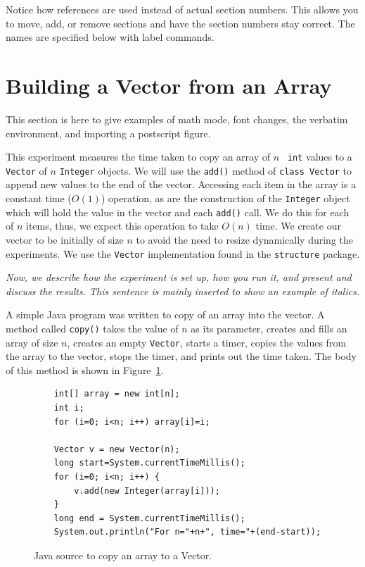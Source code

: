 \documentclass[12pt]{article}
\newcommand{\singlespace}{
  \protect\renewcommand\baselinestretch{1.0}
  \protect\normalsize
}
\begin{document}
Notice how references are used instead of actual section numbers.
This allows you to move, add, or remove sections and have the section
numbers stay correct.  The names are specified below with label commands.

\section{Building a Vector from an Array}
\label{sec:vectarray}

This section is here to give examples of math mode, font changes, the
verbatim environment, and importing a postscript figure.

This experiment measures the time taken to copy an array of $n$ {\tt
int} values to a {\tt Vector} of $n$ {\tt Integer} objects.  We will
use the {\tt add()} method of {\tt class Vector} to append new
values to the end of the vector.  Accessing each item in the array is
a constant time ($O(1)$) operation, as are the construction of the
{\tt Integer} object which will hold the value in the vector and each
{\tt add()} call.  We do this for each of $n$ items, thus, we
expect this operation to take $O(n)$ time.  We create our vector to be
initially of size $n$ to avoid the need to resize dynamically during
the experiments.  We use the {\tt Vector} implementation found in the
{\tt structure} package.


{\it Now, we describe how the experiment is set up, how you run it, and
present and discuss the results.  This sentence is mainly inserted to
show an example of italics.}

A simple Java program was written to copy of an array into the
vector.  A method called {\tt copy()} takes the value of $n$ as its
parameter, creates and fills an array of size $n$, creates an empty
{\tt Vector}, starts a timer, copies the values from the array to the
vector, stops the timer, and prints out the time taken.  The body of
this method is shown in Figure~\ref{fig:code}.

{\singlespace %
\begin{figure}[htb]
\begin{verbatim}
    int[] array = new int[n];
    int i;
    for (i=0; i<n; i++) array[i]=i;
	
    Vector v = new Vector(n);
    long start=System.currentTimeMillis();
    for (i=0; i<n; i++) {
        v.add(new Integer(array[i]));
    }
    long end = System.currentTimeMillis();
    System.out.println("For n="+n+", time="+(end-start));
\end{verbatim}
\caption{Java source to copy an array to a Vector.}
\label{fig:code}
\end{figure}
}
\end{document}
